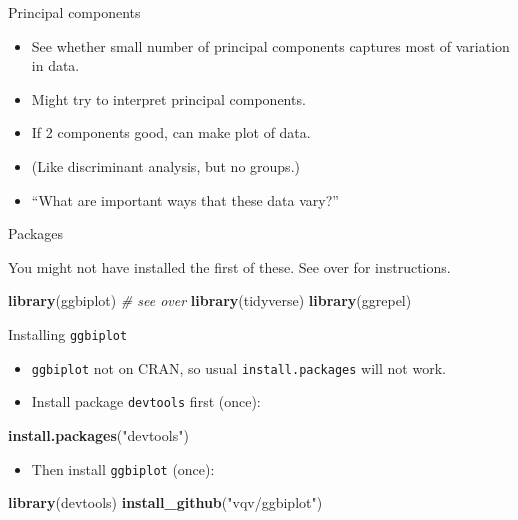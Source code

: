 \documentclass[ignorenonframetext,]{beamer}
\newenvironment{Shaded}{\begin{snugshade}}{\end{snugshade}}
\newcommand{\CommentTok}[1]{\textcolor[rgb]{0.56,0.35,0.01}{\textit{#1}}}
\newcommand{\KeywordTok}[1]{\textcolor[rgb]{0.13,0.29,0.53}{\textbf{#1}}}
\newcommand{\NormalTok}[1]{#1}
\newcommand{\StringTok}[1]{\textcolor[rgb]{0.31,0.60,0.02}{#1}}
\providecommand{\tightlist}{%
  \setlength{\itemsep}{0pt}\setlength{\parskip}{0pt}}
\begin{document}
\begin{frame}{Principal components}
\protect\hypertarget{principal-components-1}{}

\begin{itemize}
\item
  See whether small number of principal components captures most of
  variation in data.
\item
  Might try to interpret principal components.
\item
  If 2 components good, can make plot of data.
\item
  (Like discriminant analysis, but no groups.)
\item
  ``What are important ways that these data vary?''
\end{itemize}

\end{frame}

\begin{frame}[fragile]{Packages}
\protect\hypertarget{packages-9}{}

You might not have installed the first of these. See over for
instructions.

\begin{Shaded}
\begin{Highlighting}[]
\KeywordTok{library}\NormalTok{(ggbiplot) }\CommentTok{# see over}
\KeywordTok{library}\NormalTok{(tidyverse)}
\KeywordTok{library}\NormalTok{(ggrepel)}
\end{Highlighting}
\end{Shaded}

\end{frame}

\begin{frame}[fragile]{Installing \texttt{ggbiplot}}
\protect\hypertarget{installing-ggbiplot-1}{}

\begin{itemize}
\item
  \texttt{ggbiplot} not on CRAN, so usual \texttt{install.packages} will
  not work.
\item
  Install package \texttt{devtools} first (once):
\end{itemize}

\begin{Shaded}
\begin{Highlighting}[]
\KeywordTok{install.packages}\NormalTok{(}\StringTok{"devtools"}\NormalTok{)}
\end{Highlighting}
\end{Shaded}

\begin{itemize}
\tightlist
\item
  Then install \texttt{ggbiplot} (once):
\end{itemize}

\begin{Shaded}
\begin{Highlighting}[]
\KeywordTok{library}\NormalTok{(devtools)}
\KeywordTok{install_github}\NormalTok{(}\StringTok{"vqv/ggbiplot"}\NormalTok{)}
\end{Highlighting}
\end{Shaded}

\end{frame}
\end{document}
